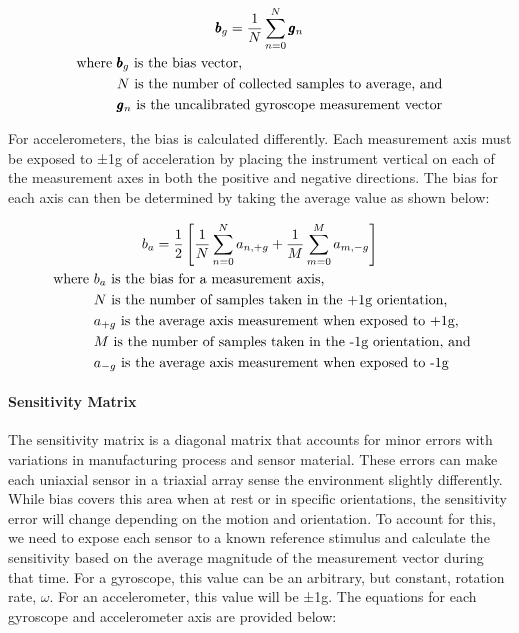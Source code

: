 \begin{gather} \labeq{gyroscope_bias}
    \pmb{b}_g = \frac{1}{N} \sum_{n=0}^N{\pmb{g}_n} \\
    \begin{aligned}
        \text{where } & \pmb{b}_g \text{ is the bias vector,} \\
        & N \text{ is the number of collected samples to average, and} \\
        & \pmb{g}_n \text{ is the uncalibrated gyroscope measurement vector}
    \end{aligned} \notag
\end{gather}

For accelerometers, the bias is calculated differently. Each measurement axis must be exposed to ±1g of acceleration by placing the instrument vertical on each of the measurement axes in both the positive and negative directions. The bias for each axis can then be determined by taking the average value as shown below:

\begin{gather} \labeq{accelerometer_bias}
    b_a = \frac{1}{2} \left[ \frac{1}{N}\sum_{n=0}^N{a_{n,+g}} + \frac{1}{M}\sum_{m=0}^M{a_{m,-g}} \right] \\\
    \begin{aligned}
        \text{where } & b_a \text{ is the bias for a measurement axis,} \\
        & N \text{ is the number of samples taken in the +1g orientation,} \\
        & a_{+g} \text{ is the average axis measurement when exposed to +1g,}\\
        & M \text{ is the number of samples taken in the -1g orientation, and} \\
        & a_{-g} \text{ is the average axis measurement when exposed to -1g}
    \end{aligned} \notag
\end{gather}

\paragraph*{Sensitivity Matrix} The sensitivity matrix is a diagonal matrix that accounts for minor errors with variations in manufacturing process and sensor material. 
These errors can make each uniaxial sensor in a triaxial array sense the environment slightly differently. 
While bias covers this area when at rest or in specific orientations, the sensitivity error will change depending on the motion and orientation. 
To account for this, we need to expose each sensor to a known reference stimulus and calculate the sensitivity based on the average magnitude of the measurement vector during that time. 
For a gyroscope, this value can be an arbitrary, but constant, rotation rate, $\omega$. 
For an accelerometer, this value will be ±1g. The equations for each gyroscope and accelerometer axis are provided below:

